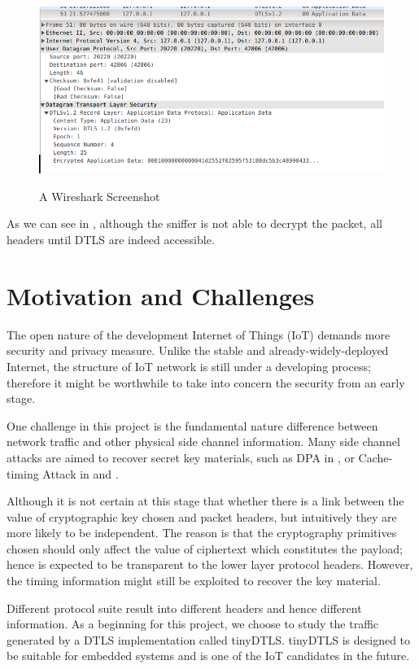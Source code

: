 \begin{figure}[H] 
\centering
\resizebox{12cm}{!}
{\includegraphics{./Pics/Sniffer.png}}
\caption{A Wireshark Screenshot}
\label{Fig: Sniffer}
\end{figure}

As we can see in  , although the sniffer is not able to decrypt the packet, all headers until DTLS are indeed accessible.

\section{Motivation and Challenges}
The open nature of the development Internet of Things (IoT) demands more security and privacy measure. Unlike the stable and already-widely-deployed Internet, the structure of IoT network is still under a developing process; therefore it might be worthwhile to take into concern the security from an early stage.

One challenge in this project is the fundamental nature difference between network traffic and other physical side channel information. Many side channel attacks are aimed to recover secret key materials, such as DPA in \cite{DPA}, or Cache-timing Attack in \cite{Cache-Timing1} and \cite{Cache-Timing2}. 

Although it is not certain at this stage that whether there is a link between the value of cryptographic key chosen and packet headers, but intuitively they are more likely to be independent. The reason is that the cryptography primitives chosen should only affect the value of ciphertext which constitutes the payload; hence is expected to be transparent to the lower layer protocol headers. However, the timing information might still be exploited to recover the key material.

Different protocol suite result into different headers and hence different information. As a beginning for this project, we choose to study the traffic generated by a DTLS implementation called tinyDTLS\cite{tinyDTLS}. tinyDTLS is designed to be suitable for embedded systems and is one of the IoT candidates in the future.


